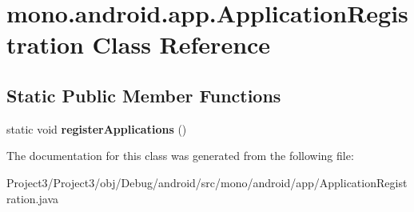 \hypertarget{classmono_1_1android_1_1app_1_1ApplicationRegistration}{}\section{mono.\+android.\+app.\+Application\+Registration Class Reference}
\label{classmono_1_1android_1_1app_1_1ApplicationRegistration}
\subsection*{Static Public Member Functions}
\begin{DoxyCompactItemize}
\item 
\mbox{\label{classmono_1_1android_1_1app_1_1ApplicationRegistration_aa4d14d9d7a2c1c57a8ddf959fbb71e47}} 
static void {\bfseries register\+Applications} ()
\end{DoxyCompactItemize}


The documentation for this class was generated from the following file\+:\begin{DoxyCompactItemize}
\item 
Project3/\+Project3/obj/\+Debug/android/src/mono/android/app/Application\+Registration.\+java\end{DoxyCompactItemize}
